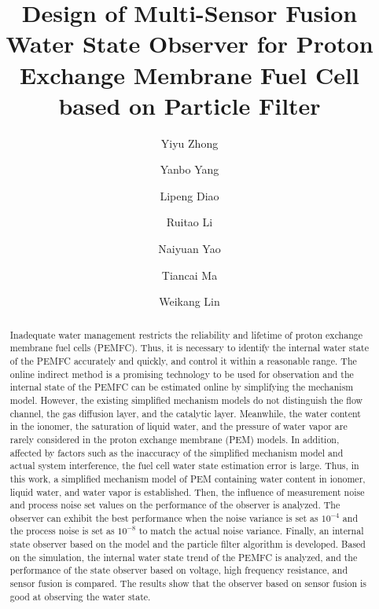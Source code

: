 \documentclass[preprint]{elsarticle}
\title{Design of Multi-Sensor Fusion Water State Observer for Proton Exchange Membrane Fuel Cell based on Particle Filter}
\author[a]{Yiyu Zhong}
\author[a]{Yanbo Yang\corref{mycorrespondingauthor}}
\author[c]{Lipeng Diao}
\author[a]{Ruitao Li}
\author[a]{Naiyuan Yao}
\author[a,b]{Tiancai Ma}
\author[a]{Weikang Lin}
\begin{document}
\begin{abstract}

    Inadequate water management restricts the reliability and lifetime of proton exchange membrane fuel cells (PEMFC). Thus, it is necessary to identify the internal water state of the PEMFC accurately and quickly, and control it within a reasonable range. The online indirect method is a promising technology to be used for observation and the internal state of the PEMFC can be estimated online by simplifying the mechanism model. However, the existing simplified mechanism models do not distinguish the flow channel, the gas diffusion layer, and the catalytic layer. Meanwhile, the water content in the ionomer, the saturation of liquid water, and the pressure of water vapor are rarely considered in the proton exchange membrane (PEM) models. In addition, affected by factors such as the inaccuracy of the simplified mechanism model and actual system interference, the fuel cell water state estimation error is large. Thus, in this work, a simplified mechanism model of PEM containing water content in ionomer, liquid water, and water vapor is established. Then, the influence of measurement noise and process noise set values on the performance of the observer is analyzed. The observer can exhibit the best performance when the noise variance is set as $10^{-4}$ and the process noise is set as $10^{-8}$ to match the actual noise variance. Finally, an internal state observer based on the model and the particle filter algorithm is developed. Based on the simulation, the internal water state trend of the PEMFC is analyzed, and the performance of the state observer based on voltage, high frequency resistance, and sensor fusion is compared. The results show that the observer based on sensor fusion is good at observing the water state. 
\end{abstract}
\maketitle






\end{document}
